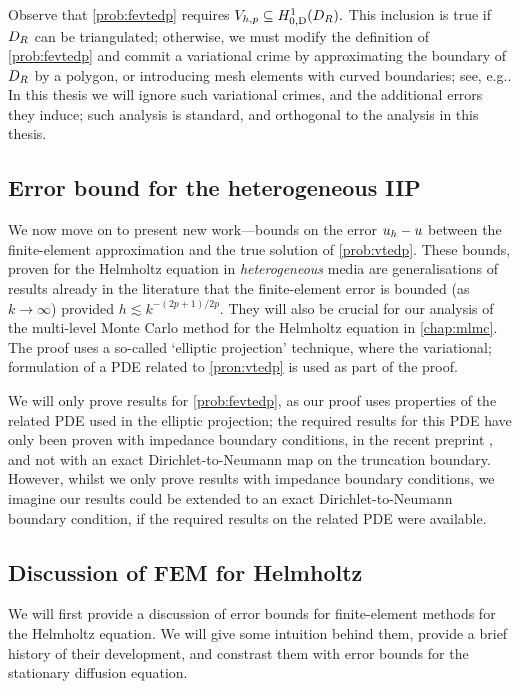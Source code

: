     Observe that \cref{prob:fevtedp} requires $\Vhp \subseteq \HozDDR.$ This inclusion is true if $D_{R}$ can be triangulated; otherwise, we must modify the definition of \cref{prob:fevtedp} and commit a variational crime by approximating the boundary of $D_{R}$ by a polygon, or introducing mesh elements with curved boundaries; see, e.g.. In this thesis we will ignore such variational crimes, and the additional errors they induce; such analysis is standard, and orthogonal to the analysis in this thesis.
    \ere
    

    \subsection{Error bound for the heterogeneous IIP}\label{sec:errbound}

    We now move on to present new work---bounds on the error $u_{h}-u$ between the finite-element approximation and the true solution of \cref{prob:vtedp}. These bounds, proven for the Helmholtz equation in \emph{heterogeneous} media are generalisations of results already in the literature that the finite-element error is bounded (as $k\rightarrow \infty$) provided $h \lesssim k^{-(2p+1)/2p}$. They will also be crucial for our analysis of the multi-level Monte Carlo method for the Helmholtz equation in \cref{chap:mlmc}. The proof uses a so-called `elliptic projection' technique, where the variational; formulation of a PDE related to \cref{pron:vtedp} is used as part of the proof. 

We will only prove results for \cref{prob:fevtedp}, as our proof uses properties of the related PDE used in the elliptic projection; the required results for this PDE have only been proven with impedance boundary conditions, in the recent preprint \cite{ChNiTo:18}, and not with an exact Dirichlet-to-Neumann map on the truncation boundary. However, whilst we only prove results with impedance boundary conditions, we imagine our results could be extended to an exact Dirichlet-to-Neumann boundary condition, if the required results on the related PDE were available.

\subsection{Discussion of FEM for Helmholtz}\label{sec:helmfedisc}

We will first provide a discussion of error bounds for finite-element methods for the Helmholtz equation. We will give some intuition behind them, provide a brief history of their development, and constrast them with error bounds for the stationary diffusion equation.

